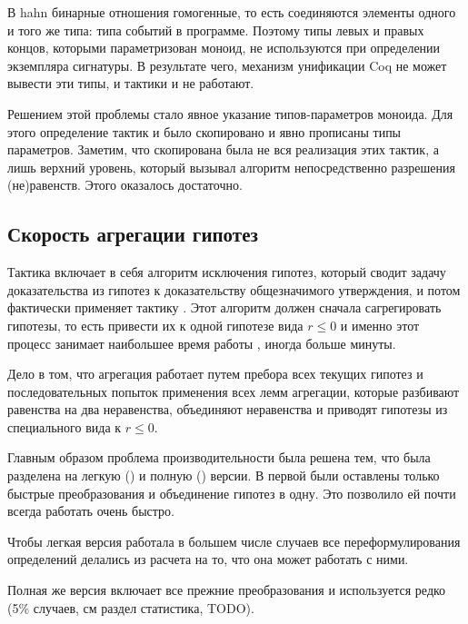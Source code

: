 \documentclass[times
              ]{itmo-student-thesis}
\begin{document}
      В hahn бинарные отношения гомогенные, то есть соединяются элементы одного и того же
      типа: типа событий в программе. Поэтому типы левых и правых концов, которыми
      параметризован моноид, не
      используются при определении экземпляра сигнатуры. В результате чего, механизм унификации Coq не
      может вывести эти типы, и тактики  и  не работают.
      
      Решением этой проблемы стало явное указание типов-параметров моноида. Для этого определение
      тактик  и  было скопировано и явно прописаны типы параметров. Заметим, что
      скопирована была не вся реализация этих тактик, а лишь верхний уровень, который вызывал
      алгоритм непосредственно разрешения (не)равенств. Этого оказалось достаточно.

    \subsection{Скорость агрегации гипотез}

      Тактика  включает в себя алгоритм исключения гипотез\cite{hkat,hkat_cpc}, который
      сводит задачу доказательства из гипотез к доказательству общезначимого утверждения,
      и потом фактически применяет тактику . Этот алгоритм должен сначала сагрегировать
      гипотезы, то есть привести их к одной гипотезе вида
      $r \leq 0$ и именно этот процесс занимает наибольшее время работы , иногда больше минуты.

      Дело в том, что агрегация работает путем пребора всех текущих гипотез и последовательных попыток
      применения всех лемм агрегации, которые разбивают равенства на два неравенства, объединяют
      неравенства и приводят гипотезы из специального вида к $r \leq 0$.

      Главным образом проблема производительности была решена тем, что  была разделена на
      легкую () и полную () версии. 
      В первой были оставлены только быстрые преобразования и объединение гипотез в одну. 
      Это позволило ей почти всегда работать очень быстро.
      
      Чтобы легкая версия работала в большем числе случаев все переформулирования определений
      делались из расчета на то, что она может работать с ними.

      Полная же версия включает все прежние преобразования и используется редко (5\% случаев, см раздел
      статистика, TODO).
      
\end{document}
